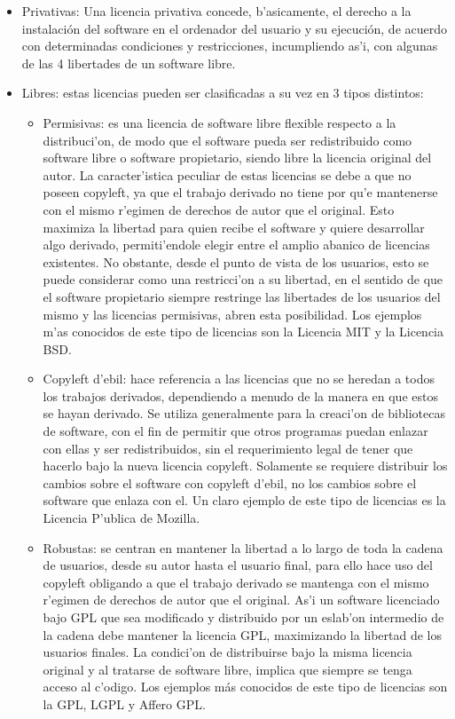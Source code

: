 \documentclass{book}
\begin{document}
\begin{itemize}
\item Privativas:  Una licencia privativa concede, b'asicamente, el derecho a la instalación del software en el ordenador del usuario y su ejecución, de acuerdo con determinadas condiciones y restricciones, incumpliendo as'i, con algunas de las 4 libertades de un software libre.
\item Libres: estas licencias pueden ser clasificadas a su vez en 3 tipos distintos:
\begin{itemize}
\item Permisivas: es una licencia de software libre flexible respecto a la distribuci'on, de modo que el software pueda ser redistribuido como software libre o software propietario, siendo libre la licencia original del autor.
La caracter'istica peculiar de estas licencias se debe a que no poseen copyleft, ya que el trabajo derivado no tiene por qu'e mantenerse con el mismo r'egimen de derechos de autor que el original. Esto maximiza la libertad para quien recibe el software y quiere desarrollar algo derivado, permiti'endole elegir entre el amplio abanico de licencias existentes. No obstante, desde el punto de vista de los usuarios, esto se puede considerar como una restricci'on a su libertad, en el sentido de que el software propietario siempre restringe las libertades de los usuarios del mismo y las licencias permisivas, abren esta posibilidad. Los ejemplos m'as conocidos de este tipo de licencias son la Licencia MIT y la Licencia BSD.
\item Copyleft d'ebil: hace referencia a las licencias que no se heredan a todos los trabajos derivados, dependiendo a menudo de la manera en que estos se hayan derivado. Se utiliza generalmente para la creaci'on de bibliotecas de software, con el fin de permitir que otros programas puedan enlazar con ellas y ser redistribuidos, sin el requerimiento legal de tener que hacerlo bajo la nueva licencia copyleft. Solamente se requiere distribuir los cambios sobre el software con copyleft d'ebil, no los cambios sobre el software que enlaza con el. Un claro ejemplo de este tipo de licencias es la Licencia P'ublica de Mozilla.
\item Robustas: se centran en mantener la libertad a lo largo de toda la cadena de usuarios, desde su autor hasta el usuario final, para ello hace uso del copyleft obligando a que el trabajo derivado se mantenga con el mismo r'egimen de derechos de autor que el original. As'i un software licenciado bajo GPL que sea modificado y distribuido por un eslab'on intermedio de la cadena debe mantener la licencia GPL, maximizando la libertad de los usuarios finales.
La condici'on de distribuirse bajo la misma licencia original y al tratarse de software libre, implica que siempre se tenga acceso al c'odigo.
Los ejemplos más conocidos de este tipo de licencias son la GPL, LGPL y Affero GPL.
\end{itemize}
\end{itemize}
\newpage
\end{document}
